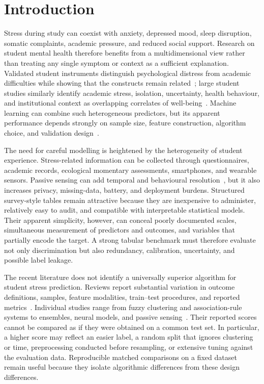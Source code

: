 \documentclass[review]{elsarticle}
\begin{document}
\section{Introduction}\label{sec:introduction}
Stress during study can coexist with anxiety, depressed mood, sleep disruption, somatic complaints, academic pressure, and reduced social support. Research on student mental health therefore benefits from a multidimensional view rather than treating any single symptom or context as a sufficient explanation. Validated student instruments distinguish psychological distress from academic difficulties while showing that the constructs remain related~\cite{curelaru2025}; large student studies similarly identify academic stress, isolation, uncertainty, health behaviour, and institutional context as overlapping correlates of well-being~\cite{rahman2023,worsley2024}. Machine learning can combine such heterogeneous predictors, but its apparent performance depends strongly on sample size, feature construction, algorithm choice, and validation design~\cite{daza2023,dong2020,chung2022}.

The need for careful modelling is heightened by the heterogeneity of student experience. Stress-related information can be collected through questionnaires, academic records, ecological momentary assessments, smartphones, and wearable sensors. Passive sensing can add temporal and behavioural resolution~\cite{price2023,montag2023,shvetcov2024}, but it also increases privacy, missing-data, battery, and deployment burdens. Structured survey-style tables remain attractive because they are inexpensive to administer, relatively easy to audit, and compatible with interpretable statistical models. Their apparent simplicity, however, can conceal poorly documented scales, simultaneous measurement of predictors and outcomes, and variables that partially encode the target. A strong tabular benchmark must therefore evaluate not only discrimination but also redundancy, calibration, uncertainty, and possible label leakage.

The recent literature does not identify a universally superior algorithm for student stress prediction. Reviews report substantial variation in outcome definitions, samples, feature modalities, train--test procedures, and reported metrics~\cite{daza2023,cruz2025,humayun2025}. Individual studies range from fuzzy clustering and association-rule systems to ensembles, neural models, and passive sensing~\cite{han2023,defilippis2024,fu2025,shvetcov2024}. Their reported scores cannot be compared as if they were obtained on a common test set. In particular, a higher score may reflect an easier label, a random split that ignores clustering or time, preprocessing conducted before resampling, or extensive tuning against the evaluation data. Reproducible matched comparisons on a fixed dataset remain useful because they isolate algorithmic differences from these design differences.
\end{document}
